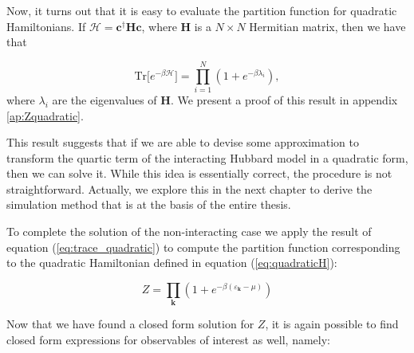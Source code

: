 Now, it turns out that it is easy to evaluate the partition function for quadratic Hamiltonians. If $\mathcal{H} = \bm c^\dagger \bm H \bm c$, where $\bm H$ is a $N \times N$ Hermitian matrix, then we have that

\begin{equation}\label{eq:trace_quadratic}
\text{Tr} \big[ e^{-\beta \mathcal{H} } \big] = \prod_{i=1}^N ( 1 + e^{-\beta \lambda_i } ) ,
\end{equation}
where $\lambda_i$ are the eigenvalues of $\bm H$. We present a proof of this result in appendix \ref{ap:Zquadratic}.

This result suggests that if we are able to devise some approximation to transform the quartic term of the interacting Hubbard model in a quadratic form, then we can solve it.
While this idea is essentially correct, the procedure is not straightforward.
Actually, we explore this in the next chapter to derive the simulation method that is at the basis of the entire thesis.

To complete the solution of the non-interacting case we apply the result of equation (\ref{eq:trace_quadratic}) to compute the partition function corresponding to the quadratic Hamiltonian defined in equation (\ref{eq:quadraticH}):

\begin{equation}
Z = \prod_{\bm k} ( 1 + e^{-\beta (\varepsilon_{\bm k} - \mu )} )
\end{equation}

Now that we have found a closed form solution for $Z$, it is again possible to find closed form expressions for observables of interest as well, namely:

